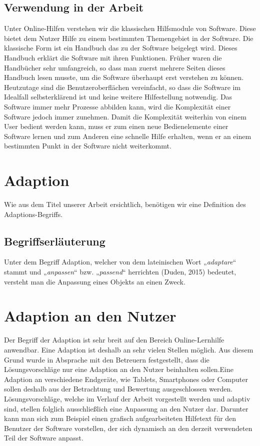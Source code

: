 \subsection{Verwendung in der Arbeit}
Unter Online-Hilfen verstehen wir die klassischen Hilfsmodule von Software. Diese bietet dem Nutzer Hilfe zu einem bestimmten Themengebiet in der Software. Die klassische Form ist ein Handbuch das zu der Software beigelegt wird. Dieses Handbuch erklärt die Software mit ihren Funktionen. Früher waren die Handbücher sehr umfangreich, so dass man zuerst mehrere Seiten dieses Handbuch lesen musste, um die Software überhaupt erst verstehen zu können. Heutzutage sind die Benutzeroberflächen vereinfacht, so dass die Software im Idealfall selbsterklärend ist und keine weitere Hilfestellung notwendig. Das Software immer mehr Prozesse abbilden kann, wird die Komplexität einer Software jedoch immer zunehmen. Damit die Komplexität weiterhin von einem User bedient werden kann, muss er zum einen neue Bedienelemente einer Software lernen und zum Anderen eine schnelle Hilfe erhalten, wenn er an einem bestimmten Punkt in der Software nicht weiterkommt.

\section{Adaption}
\label{ch:Content1}
Wie aus dem Titel unserer Arbeit ersichtlich, benötigen wir eine Definition des Adaptions-Begriffs.

\subsection{Begriffserläuterung}
Unter dem Begriff Adaption, welcher von dem lateinischen Wort „\textit{adaptare}“ stammt und „\textit{anpassen}“ bzw. „\textit{passend}“ herrichten (Duden, 2015) bedeutet, versteht man die Anpassung eines Objekts an einen Zweck. 

\section{Adaption an den Nutzer}
Der Begriff der Adaption ist sehr breit auf den Bereich Online-Lernhilfe anwendbar. Eine Adaption ist deshalb an sehr vielen Stellen möglich. Aus diesem Grund wurde in Absprache mit den Betreuern festgestellt, dass die Lösungsvorschläge nur eine Adaption an den Nutzer beinhalten sollen.Eine Adaption an verschiedene Endgeräte, wie Tablets, Smartphones oder Computer sollen deshalb aus der Betrachtung und Bewertung ausgeschlossen werden. Lösungsvorschläge, welche im Verlauf der Arbeit vorgestellt werden und adaptiv sind, stellen folglich ausschließlich eine Anpassung an den Nutzer dar. Darunter kann man sich zum Beispiel einen grafisch aufgearbeiteten Hilfetext für den Benutzer der Software vorstellen, der sich dynamisch an den derzeit verwendeten Teil der Software anpasst.

